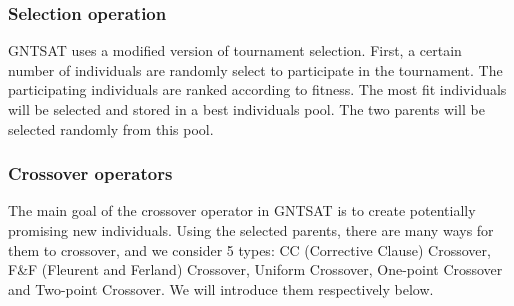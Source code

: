 \subsubsection{Selection operation}
GNTSAT uses a modified version of tournament selection. First, a certain
number of individuals are randomly select to participate in the tournament.
The participating individuals are ranked according to fitness. The most fit
individuals will be selected and stored in a best individuals pool. The two
parents will be selected randomly from this pool.

\subsubsection{Crossover operators}
The main goal of the crossover operator in GNTSAT is to create potentially
promising new individuals. Using the selected parents, there are many ways for
them to crossover, and we consider 5 types: CC (Corrective Clause) Crossover,
F\&F (Fleurent and Ferland) Crossover, Uniform Crossover, One-point Crossover
and Two-point Crossover. We will introduce them respectively below.

